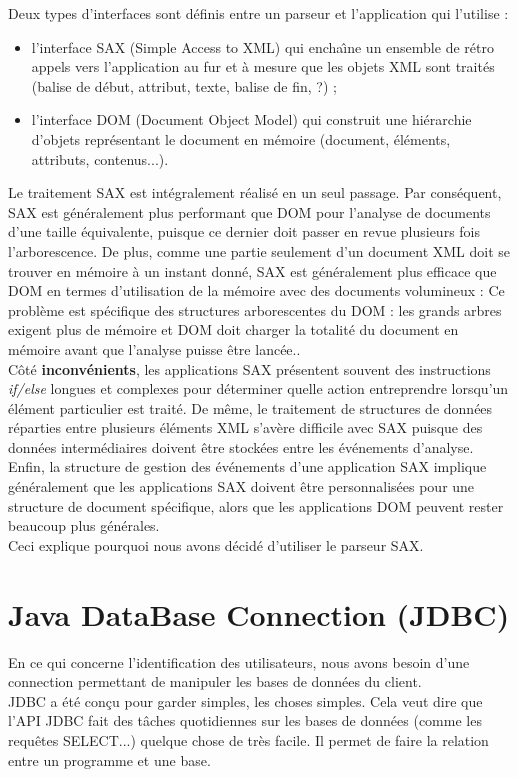 Deux types d'interfaces sont d{\'e}finis entre un parseur et l'application qui l'utilise :
\begin{itemize}
\item l'interface SAX (Simple Access to XML) qui encha{\^\i}ne un ensemble de r{\'e}tro appels vers l'application au fur et {\`a} mesure que les objets XML sont trait{\'e}s (balise de d{\'e}but, attribut, texte, balise de fin, ?) ;
\item l'interface DOM (Document Object Model) qui construit une hi{\'e}rarchie d'objets repr{\'e}sentant le document en m{\'e}moire (document, {\'e}l{\'e}ments, attributs, contenus...).\\
\end{itemize}
Le traitement SAX est int{\'e}gralement r{\'e}alis{\'e} en un seul passage. Par
cons{\'e}quent, SAX est g{\'e}n{\'e}ralement plus performant que DOM pour
l'analyse de documents d'une taille {\'e}quivalente, puisque ce dernier
doit passer en revue plusieurs fois l'arborescence. De plus, comme une
partie seulement d'un document XML doit se trouver en m{\'e}moire {\`a} un
instant donn{\'e}, SAX est g{\'e}n{\'e}ralement plus efficace que DOM en termes
d'utilisation de la m{\'e}moire avec des documents volumineux : Ce
probl{\`e}me est sp{\'e}cifique des structures arborescentes du DOM : les
grands arbres exigent plus de m{\'e}moire et DOM doit charger la totalit{\'e}
du document en m{\'e}moire avant que l'analyse puisse {\^e}tre lanc{\'e}e..\\
C{\^o}t{\'e} {\bf inconv{\'e}nients}, les applications SAX pr{\'e}sentent souvent des
instructions {\it if/else} longues et complexes pour d{\'e}terminer quelle
action entreprendre lorsqu'un {\'e}l{\'e}ment particulier est trait{\'e}. De m{\^e}me,
le traitement de structures de donn{\'e}es r{\'e}parties entre plusieurs
{\'e}l{\'e}ments XML s'av{\`e}re difficile avec SAX puisque des donn{\'e}es
interm{\'e}diaires doivent {\^e}tre stock{\'e}es entre les {\'e}v{\'e}nements
d'analyse. Enfin, la structure de gestion des {\'e}v{\'e}nements d'une
application SAX implique g{\'e}n{\'e}ralement que les applications SAX doivent
{\^e}tre personnalis{\'e}es pour une structure de document sp{\'e}cifique, alors
que les applications DOM peuvent rester beaucoup plus g{\'e}n{\'e}rales.\\

Ceci explique pourquoi nous avons d{\'e}cid{\'e} d'utiliser le parseur SAX.




\section{Java DataBase Connection (JDBC)}
En ce qui concerne l'identification des utilisateurs, nous avons
besoin d'une connection permettant de manipuler les bases de donn{\'e}es du client.\\ 
JDBC a {\'e}t{\'e} con{\c c}u pour garder simples, les choses simples. Cela veut dire que l'API JDBC fait des t{\^a}ches quotidiennes sur les bases de donn{\'e}es (comme les requ{\^e}tes SELECT...) quelque chose de tr{\`e}s facile. Il permet de faire la relation entre un programme et une base.\\


